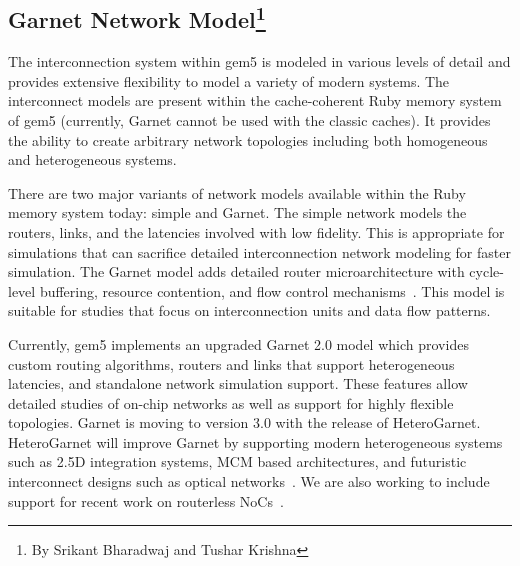 \subsection[Garnet Network Model]{Garnet Network Model\footnote{By Srikant Bharadwaj and Tushar Krishna}}
\label{sec:garnet}

The interconnection system within gem5 is modeled in various levels of detail and provides extensive
flexibility to model a variety of modern systems.
The interconnect models are present within the cache-coherent Ruby memory system of gem5 (currently, Garnet cannot be used with the classic caches).
It provides the ability to create arbitrary network topologies including both homogeneous and heterogeneous systems.

There are two major variants of network models available within the Ruby memory system today: simple and Garnet.
The simple network models the routers, links, and the latencies involved with low fidelity.
This is appropriate for simulations that can sacrifice detailed interconnection network modeling for faster simulation.
The Garnet model adds detailed router microarchitecture with cycle-level buffering, resource contention, and flow control mechanisms~\cite{garnet-2}.
This model is suitable for studies that focus on interconnection units and data flow patterns.

Currently, gem5 implements an upgraded Garnet 2.0 model which provides custom routing algorithms, routers and links that support heterogeneous latencies, and standalone network simulation support.
These features allow detailed studies of on-chip networks as well as support for highly flexible topologies.
Garnet is moving to version 3.0 with the release of HeteroGarnet.
HeteroGarnet will improve Garnet by supporting modern heterogeneous systems such as 2.5D integration systems, MCM based architectures, and futuristic interconnect designs such as optical networks~\cite{kite}.
We are also working to include support for recent work on routerless NoCs~\cite{AlazemiABC18, LinPPC20}.

